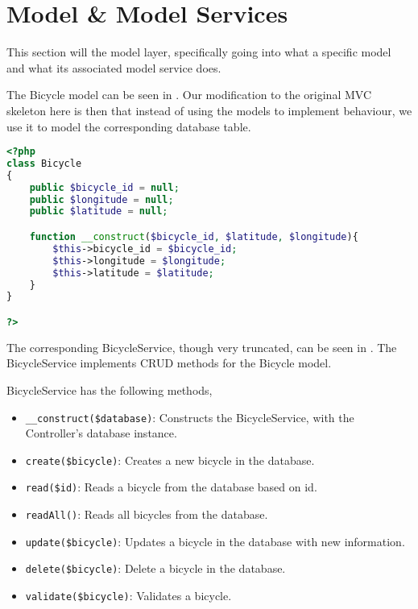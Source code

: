 \section{Model \& Model Services}
This section will the model layer, specifically going into what a specific model and what its associated model service does.

The Bicycle model can be seen in . Our modification to the original MVC skeleton here is then that instead of using the models to implement behaviour, we use it to model the corresponding database table.

\begin{minipage}{\textwidth}
\begin{lstlisting}[language=php, label=lst:bicycleModel, caption={Bicycle Class}]
<?php
class Bicycle
{
    public $bicycle_id = null;
    public $longitude = null;
    public $latitude = null;

    function __construct($bicycle_id, $latitude, $longitude){
        $this->bicycle_id = $bicycle_id;
        $this->longitude = $longitude;
        $this->latitude = $latitude;
    }
}

?>
\end{lstlisting}
\end{minipage}

The corresponding BicycleService, though very truncated, can be seen in . The BicycleService implements CRUD methods for the Bicycle model.

BicycleService has the following methods,

\begin{itemize}
\item \lstinline|__construct($database)|: Constructs the BicycleService, with the Controller's database instance.
\item \lstinline|create($bicycle)|: Creates a new bicycle in the database.
\item \lstinline|read($id)|: Reads a bicycle from the database based on id.
\item \lstinline|readAll()|: Reads all bicycles from the database.
\item \lstinline|update($bicycle)|: Updates a bicycle in the database with new information.
\item \lstinline|delete($bicycle)|: Delete a bicycle in the database.
\item \lstinline|validate($bicycle)|: Validates a bicycle.
\end{itemize}

